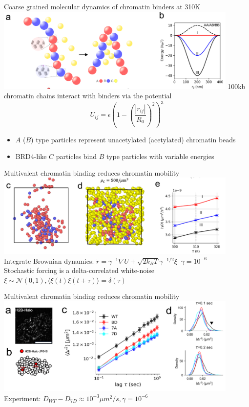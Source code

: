 \documentclass{beamer}					%
\begin{document}
\begin{frame}{Coarse grained molecular dynamics of chromatin binders at 310K}
\includegraphics[width=12cm]{media/MD-1}
100kb chromatin chains interact with binders via the potential 
\begin{equation*}
U_{ij} = \epsilon \left(1-\left(\frac{|r_{ij}|}{R_{0}}\right)^{2}\right)^{3}
\end{equation*}
\begin{itemize}
\item $A$ ($B$) type particles represent unacetylated (acetylated) chromatin beads
\item BRD4-like $C$ particles bind $B$ type particles with variable energies
\end{itemize}
\end{frame}

\begin{frame}{Multivalent chromatin binding reduces chromatin mobility}
\includegraphics[width=12cm]{media/MD-2}
Integrate Brownian dynamics: $\dot{r} = \gamma^{-1}\nabla U + \sqrt{2 k_{B}T}\gamma^{-1/2}\xi \;\; \gamma = 10^{-6}$\\
\vspace{1cm}
Stochastic forcing is a delta-correlated white-noise $\xi \sim \mathcal{N}(0,1), \langle \xi(t)\xi(t+\tau)\rangle = \delta(\tau)$
\end{frame}

\begin{frame}{Multivalent chromatin binding reduces chromatin mobility}
\includegraphics[width=12cm]{media/MSD}
Experiment: $D_{WT} - D_{7D} \approx 10^{-3} \mu m^{2}/s, \gamma = 10^{-6}$

\end{frame}
\end{document}
